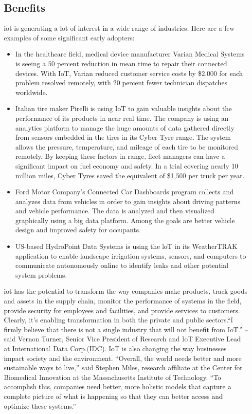 \subsection{Benefits}
\gls{iot} is generating a lot of interest in a wide range of industries. Here are a few examples of some significant
early adopters:\\
\begin{itemize}
	\item In the healthcare field, medical device manufacturer Varian Medical Systems is seeing a 50 percent reduction
in mean time to repair their connected devices.\cite{varian_reduce} With IoT, Varian reduced customer service costs by
\$2,000 for each problem resolved remotely, with 20 percent fewer technician dispatches worldwide.
	\item Italian tire maker Pirelli is using IoT to gain valuable insights about the performance of its products in near real
time.\cite{6861917} The company is using an analytics platform to manage the huge amounts of data gathered
directly from sensors embedded in the tires in its Cyber Tyre range. The system allows the pressure,
temperature, and mileage of each tire to be monitored remotely. By keeping these factors in range, fleet
managers can have a significant impact on fuel economy and safety. In a trial covering nearly 10 million
miles, Cyber Tyres saved the equivalent of \$1,500 per truck per year\cite{5659348}.
\item Ford Motor Company’s Connected Car Dashboards program collects and analyzes data from vehicles
in order to gain insights about driving patterns and vehicle performance. The data is analyzed and
then visualized graphically using a big data platform. Among the goals are better vehicle design and
improved safety for occupants.\cite{6861917}
\item US-based HydroPoint Data Systems is using the loT in its WeatherTRAK application to enable landscape irrigation systems, sensors, and computers to communicate autonomously online to identify leaks and other potential system problems. \cite{6861917}
\end{itemize}

\gls{iot} has the potential to transform the way companies make products, track goods and assets in the supply
chain, monitor the performance of systems in the field, provide security for employees and facilities,
and provide services to customers. Clearly, it’s enabling transformation in both the private and public
sectors.\newline \enquote{I firmly believe that there is not a single industry that will not benefit from IoT.} -- said Vernon Turner, Senior Vice President of Research and IoT Executive Lead at International Data Corp.(IDC). IoT is also changing the way businesses impact society and the environment. “Overall, the world needs better and more sustainable ways to live,” said Stephen Miles, research affiliate at the Center for Biomedical Innovation at the Massachusetts Institute of Technology. “To accomplish this, companies need better, more holistic models that capture a complete picture of what is happening so that they can better access
and optimize these systems.”

